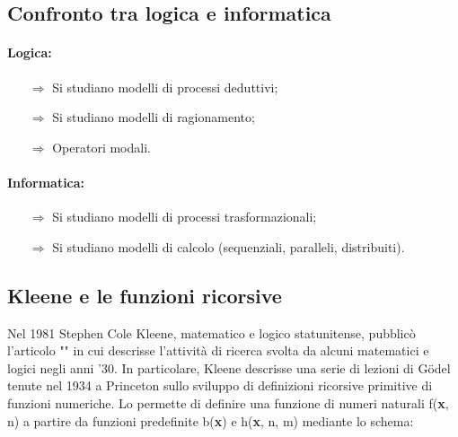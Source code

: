 
\subsection{Confronto tra logica e informatica}

\paragraph{Logica:}

\begin{itemize}
    \item [$\Rightarrow$] Si studiano modelli di processi deduttivi;
    \item [$\Rightarrow$] Si studiano modelli di ragionamento;
    \item [$\Rightarrow$] Operatori modali.
\end{itemize}

\paragraph{Informatica:}

\begin{itemize}
    \item [$\Rightarrow$] Si studiano modelli di processi trasformazionali;
    \item [$\Rightarrow$] Si studiano modelli di calcolo (sequenziali, paralleli, distribuiti).
\end{itemize}


\subsection{Kleene e le funzioni ricorsive}

Nel 1981 Stephen Cole Kleene, matematico e logico statunitense,
pubblicò l'articolo "" in cui
descrisse l'attività di ricerca svolta da alcuni matematici
e logici negli anni '30. In particolare, Kleene descrisse
una serie di lezioni di G\"odel tenute nel 1934 a Princeton
sullo sviluppo di definizioni ricorsive primitive di funzioni 
numeriche. Lo  permette di
definire una funzione di numeri naturali f(\textbf{x}, n) a partire da funzioni 
predefinite b(\textbf{x}) e h(\textbf{x}, n, m) mediante lo schema:

